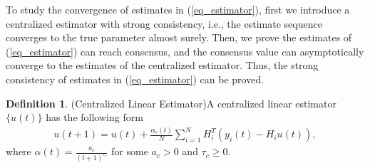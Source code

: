 \documentclass[10pt,journal,final]{IEEEtran}
\theoremstyle{plain}
\newtheorem{lemma}{\textbf{Lemma}}[section]
\theoremstyle{definition}
\newtheorem{definition}{\textbf{Definition}}[section]
\theoremstyle{remark}
\begin{document}
To study the convergence of estimates in (\ref{eq_estimator}), first we  introduce a centralized estimator with strong consistency, i.e., the estimate sequence converges to the true parameter almost surely. Then, we prove the estimates of (\ref{eq_estimator}) can reach consensus, and the consensus value can asymptotically converge to the estimates of the centralized estimator. Thus, the strong consistency of estimates in (\ref{eq_estimator}) can be proved.
\begin{definition}(Centralized Linear Estimator)\label{df_centra}
	A centralized linear estimator $\{u(t)\}$ has the following form
	\begin{align}\label{eq_ut}
	u(t+1)=u(t)+\frac{\alpha_c(t)}{N} \sum_{i=1}^{N}H_i^T\left(y_i(t)-H_iu(t)\right),
	\end{align}
	where $\alpha(t)=\frac{a_c}{(t+1)^{\tau_c}}$ for some $a_c>0$ and $\tau_c\geq 0$. 
\end{definition}
\end{document}
